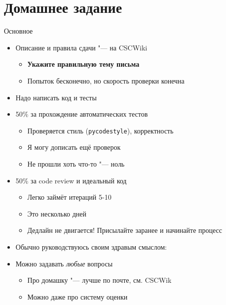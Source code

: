 \section{Домашнее задание}

\begin{frame}[t]{Основное}
	\begin{itemize}
		\item Описание и правила сдачи "--- на CSCWiki
			\begin{itemize}
				\item \textbf{Укажите правильную тему письма}
				\item Попыток бесконечно, но скорость проверки конечна
			\end{itemize}
		\item Надо написать код и тесты
		\item 50\% за прохождение автоматических тестов
			\begin{itemize}
			\item Проверяется стиль (\texttt{pycodestyle}), корректность
			\item Я могу дописать ещё проверок
			\item Не прошли хоть что-то "--- ноль
			\end{itemize}
		\item 50\% за code review и идеальный код
			\begin{itemize}
			\item Легко займёт итераций 5-10
			\item Это несколько дней
			\item Дедлайн не двигается! Присылайте заранее и начинайте процесс
			\end{itemize}
		\item Обычно руководствуюсь своим здравым смыслом:
		\item Можно задавать \textit{любые} вопросы
			\begin{itemize}
			\item Про домашку "--- лучше по почте, см. CSCWik
			\item Можно даже про систему оценки
			\end{itemize}
	\end{itemize}
\end{frame}
